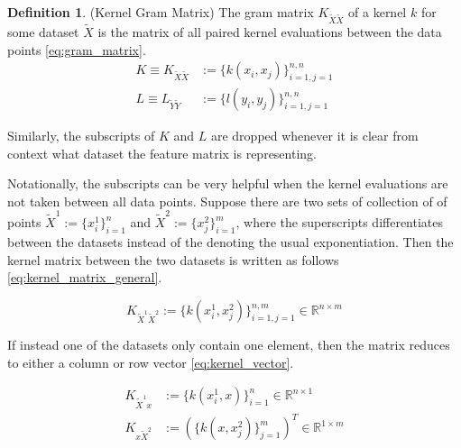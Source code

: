 \documentclass[twoside]{article} \usepackage{aistats2017}
\theoremstyle{definition}
\newtheorem{definition}[theorem]{Definition}
\newcommand{\ds}[1]{\tilde{#1}}
\begin{document}
		\begin{definition}
		\label{def:gram_matrix}
			(Kernel Gram Matrix)
			The gram matrix $K_{\ds{X} \ds{X}}$ of a kernel $k$ for some dataset $\ds{X}$ is the matrix of all paired kernel evaluations between the data points \eqref{eq:gram_matrix}.
			\begin{equation}
			\begin{aligned}
				K \equiv K_{\ds{X} \ds{X}} &:= \{k(x_{i}, x_{j})\}_{i = 1, j = 1}^{n, n} \\
				L \equiv L_{\ds{Y} \ds{Y}} &:= \{l(y_{i}, y_{j})\}_{i = 1, j = 1}^{n, n}
			\label{eq:gram_matrix}
			\end{aligned}
			\end{equation}
			
			Similarly, the subscripts of $K$ and $L$ are dropped whenever it is clear from context what dataset the feature matrix is representing.
			
			Notationally, the subscripts can be very helpful when the kernel evaluations are not taken between all data points. Suppose there are two sets of collection of of points $\ds{X}^{1} := \{x_{i}^{1}\}_{i = 1}^{n}$ and $\ds{X}^{2} := \{x_{j}^{2}\}_{i = 1}^{m}$, where the superscripts differentiates between the datasets instead of the denoting the usual exponentiation. Then the kernel matrix between the two datasets is written as follows \eqref{eq:kernel_matrix_general}.
			
			\begin{equation}
				K_{\ds{X}^{1} \ds{X}^{2}} := \{k(x_{i}^{1}, x_{j}^{2})\}_{i = 1, j = 1}^{n, m} \in \mathbb{R}^{n \times m}
			\label{eq:kernel_matrix_general}
			\end{equation}
			
			If instead one of the datasets only contain one element, then the matrix reduces to either a column or row vector \eqref{eq:kernel_vector}.
	
			\begin{equation}
			\begin{aligned}
				K_{\ds{X}^{1} x} &:= \{k(x_{i}^{1}, x)\}_{i = 1}^{n} \in \mathbb{R}^{n \times 1} \\
				K_{x \ds{X}^{2}} &:= (\{k(x, x_{j}^{2})\}_{j = 1}^{m})^{T} \in \mathbb{R}^{1 \times m}
			\label{eq:kernel_vector}
			\end{aligned}
			\end{equation}
					
			
		\end{definition}
			
\end{document}

